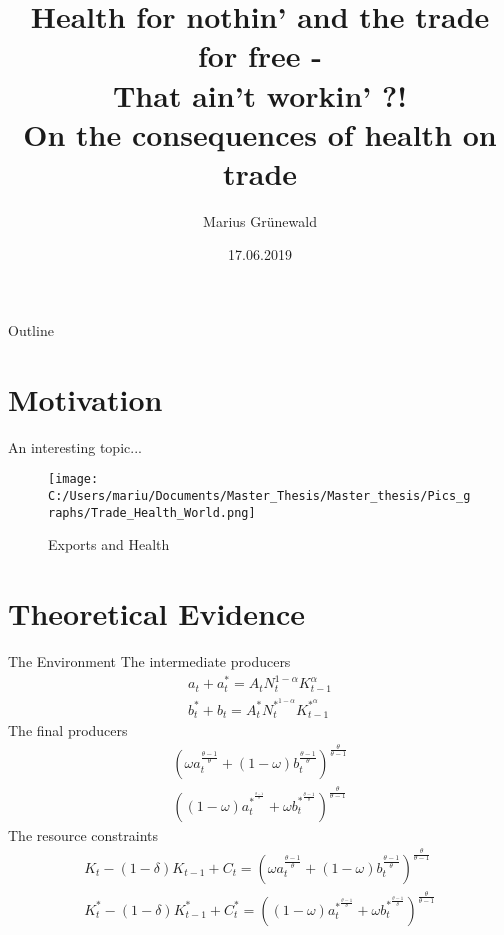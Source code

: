 \documentclass[11pt]{beamer}
\title{Health for nothin' and the trade for free - \\ That ain't workin' ?! \\[0.5cm]
On the consequences of health on trade}
\author{Marius Grünewald}
\institute{Copenhagen University}
\date{17.06.2019}
\begin{document}
\begin{frame}[noframenumbering]
  \titlepage
\end{frame}

\begin{frame}{Outline}
  \tableofcontents
  \setcounter{framenumber}{1}
\end{frame}

\section{Motivation}

\begin{frame}{An interesting topic...}
\begin{figure}[!ht]
\begin{center}\caption{Exports and Health \label{Exports and Health}}
\texttt{[image: C:/Users/mariu/Documents/Master\_Thesis/Master\_thesis/Pics\_graphs/Trade\_Health\_World.png]} \\
\end{center}
\end{figure}
\end{frame}


\section{Theoretical Evidence}


\begin{frame}{The Environment}
The intermediate producers
\begin{align}
a_t + a_t^* = A_t N_t^{1-\alpha} K_{t-1}^{\alpha} \\
b_t^* + b_t = A_t^* N_t^{*^{ 1-\alpha}} K_{t-1}^{*^{\alpha}}
\end{align}
The final producers
\begin{align}
(\omega a_t^{\frac{\theta -1}{\theta}} + (1-\omega) b_t^{\frac{\theta -1}{\theta}})^{\frac{\theta}{\theta-1}} \\
((1-\omega) a_t^{*^{^\frac{\theta -1}{\theta}}} + \omega b_t^{*^{\frac{\theta -1}{\theta}}})^{\frac{\theta}{\theta-1}}
\end{align}
The resource constraints
\begin{align}
K_t - (1-\delta)K_{t-1} + C_t = (\omega a_t^{\frac{\theta-1}{\theta}} + (1-\omega) b_t^{\frac{\theta-1}{\theta}})^{\frac{\theta}{\theta-1}} \\
K_t^* - (1-\delta)K_{t-1}^* + C^*_t= ((1-\omega) a_t^{*^{\frac{\theta-1}{\theta}}} + \omega b_t^{*^{\frac{\theta-1}{\theta}}})^{\frac{\theta}{\theta-1}}
\end{align}
\end{frame}
\end{document}
